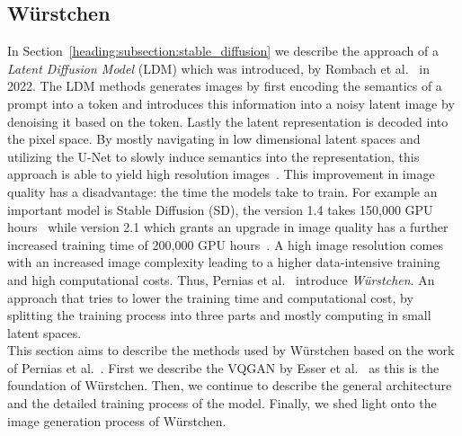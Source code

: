 \subsection{W\"urstchen}
In Section~\ref{heading:subsection:stable_diffusion} we describe the approach
of a \emph{Latent Diffusion Model} (LDM) which was introduced,
by Rombach et al.~\cite{rombach2022stablediffusion} in 2022. The LDM methods
generates images by first encoding the semantics of a prompt into a token and
introduces this information into a noisy latent image by denoising
it based on the token. Lastly the latent representation is decoded into the
pixel space. By mostly navigating in low dimensional latent spaces and
utilizing the U-Net to slowly induce semantics into the representation, this
approach is able to yield high resolution images~\cite{rombach2022stablediffusion}.
This improvement in image quality has a disadvantage: the time the models take
to train. For example an important model is Stable Diffusion (SD), the version
1.4 takes 150,000 GPU hours~\cite{rombach2022sd_1_4} while version 2.1 which
grants an upgrade in image quality has a further increased training time of
200,000 GPU hours~\cite{rombach2023sd_2_1}. A high image resolution comes with
an increased image complexity leading to a higher data-intensive training and
high computational costs. Thus, Pernias et al.~\cite{pernias2024wrstchen}
introduce \emph{W\"urstchen}. An approach that tries to lower the training time
and computational cost, by splitting the training process into three parts and
mostly computing in small latent spaces.\\

This section aims to describe the methods used by W\"urstchen based on the work
of Pernias et al.~\cite{pernias2024wrstchen}. First we describe the VQGAN by
Esser et al.~\cite{esser2021tamingtransformershighresolutionimage} as this is
the foundation of W\"urstchen. Then, we continue to describe the general
architecture and the detailed training process of the model. Finally, we shed
light onto the image generation process of W\"urstchen.

